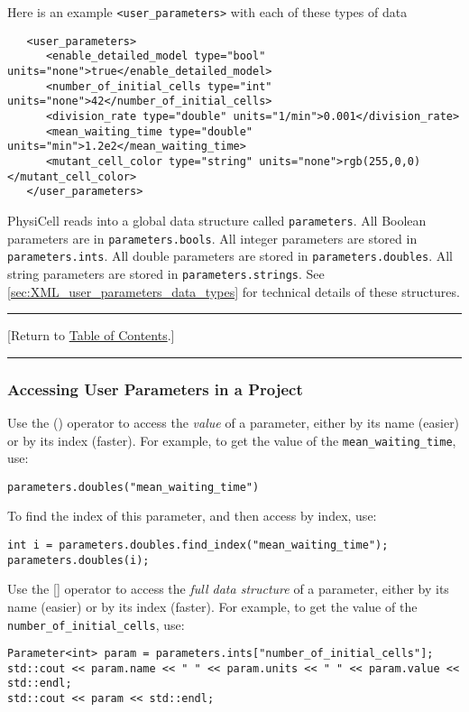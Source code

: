 \documentclass[12pt]{article}
\renewcommand{\v}{\verb}
\newcommand{\TOClink}{\begin{center}\hrule\vskip-5pt\phantom{.}\hfill[Return to \hyperlink{TOC}{Table of Contents}.]\hfill\phantom{.}\vskip3pt\hrule\end{center}}
\begin{document}
Here is an example \v|<user_parameters>| with each of these types of data
\begin{verbatim}
   <user_parameters>
      <enable_detailed_model type="bool" units="none">true</enable_detailed_model>
      <number_of_initial_cells type="int" units="none">42</number_of_initial_cells>
      <division_rate type="double" units="1/min">0.001</division_rate>
      <mean_waiting_time type="double" units="min">1.2e2</mean_waiting_time>
      <mutant_cell_color type="string" units="none">rgb(255,0,0)</mutant_cell_color>
   </user_parameters>
\end{verbatim}

PhysiCell reads into a global data structure called \v|parameters|. All Boolean 
parameters are in \v|parameters.bools|. All integer parameters are stored in 
\v|parameters.ints|. All double parameters are stored in \v|parameters.doubles|. 
All string parameters are stored in \v|parameters.strings|. See 
\ref{sec:XML_user_parameters_data_types} for technical details of 
these structures. 

\TOClink

\subsubsection{Accessing User Parameters in a Project}
\label{sec:XML_user_parameters_reading_them}
Use the () operator to access the \emph{value} of a parameter, either 
by its name (easier) or by its index (faster). For example, to get 
the value of the \v|mean_waiting_time|, use: 

\begin{verbatim}
parameters.doubles("mean_waiting_time")
\end{verbatim}

To find the index of this parameter, and then access by index, use: 

\begin{verbatim}
int i = parameters.doubles.find_index("mean_waiting_time");
parameters.doubles(i); 
\end{verbatim}

Use the [] operator to access the \emph{full data structure} of a parameter, either 
by its name (easier) or by its index (faster). For example, to get 
the value of the \v|number_of_initial_cells|, use: 

\begin{verbatim}
Parameter<int> param = parameters.ints["number_of_initial_cells"];
std::cout << param.name << " " << param.units << " " << param.value << std::endl; 
std::cout << param << std::endl; 
\end{verbatim}
\end{document}
